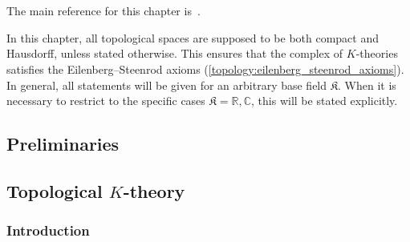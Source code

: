 \chapter{\texorpdfstring{}{K-theory}}\label{chapter:k}

    The main reference for this chapter is~\citet{karoubi_k-theory_1978}.

    In this chapter, all topological spaces are supposed to be both compact and Hausdorff, unless stated otherwise. This ensures that the complex of $K$-theories satisfies the Eilenberg--Steenrod axioms (\cref{topology:eilenberg_steenrod_axioms}). In general, all statements will be given for an arbitrary base field $\mathfrak{K}$. When it is necessary to restrict to the specific cases $\mathfrak{K}=\mathbb{R},\mathbb{C}$, this will be stated explicitly.

\section{Preliminaries}


\section{\texorpdfstring{Topological $K$-theory}{Topological K-theory}}
\subsection{Introduction}

